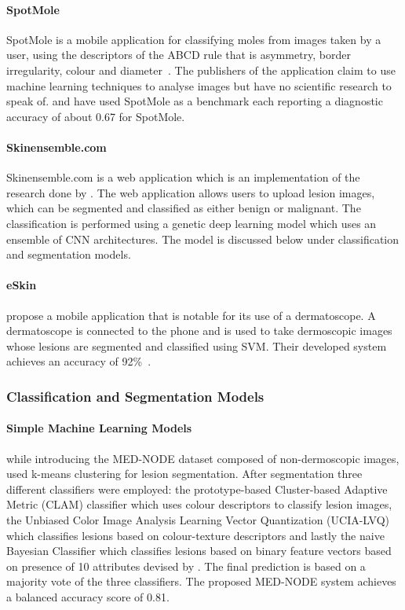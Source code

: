 \documentclass[12pt, a4paper]{article}
\begin{document}
\paragraph{SpotMole}
SpotMole is a mobile application for classifying moles from images taken by a user, using the descriptors of the ABCD rule that is asymmetry, border irregularity, colour and diameter~\cite{7532837}. The publishers of the application claim to use machine learning techniques to analyse images but have no scientific research to speak of. \cite{7532837} and \cite{giotis2015med} have used SpotMole as a benchmark each reporting a diagnostic accuracy of about 0.67 for SpotMole.
\paragraph{Skinensemble.com}
Skinensemble.com is a web application which is an implementation of the research done by \cite{perez2021ensemble}. The web application allows users to upload lesion images, which can be segmented and classified as either benign or malignant. The classification is performed using a genetic deep learning model which uses an ensemble of CNN architectures. The model is discussed below under classification and segmentation models.
\paragraph{eSkin}
\cite{jaworek2018eskin} propose a mobile application that is notable for its use of a dermatoscope. A dermatoscope is connected to the phone and is used to take dermoscopic images whose lesions are segmented and classified using SVM. Their developed system achieves an accuracy of 92\%~\citep{jaworek2016automatic}.
\subsubsection{Classification and Segmentation Models}
\paragraph{Simple Machine Learning Models}
\cite{giotis2015med} while introducing the MED-NODE dataset composed of non-dermoscopic images, used k-means clustering for lesion segmentation. After segmentation three different classifiers were employed: the prototype-based Cluster-based Adaptive Metric (CLAM) classifier which uses colour descriptors to classify lesion images, the Unbiased Color Image Analysis Learning Vector Quantization (UCIA-LVQ) which classifies lesions based on colour-texture descriptors and lastly the naive Bayesian Classifier which classifies lesions based on binary feature vectors based on presence of 10 attributes devised by \cite{giotis2013adaptive}. The final prediction is based on a majority vote of the three classifiers. The proposed MED-NODE system achieves a balanced accuracy score of 0.81.
\end{document}
